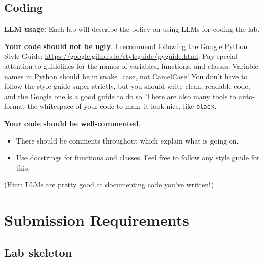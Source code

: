\documentclass[letterpaper,12pt]{article}
\begin{document}
\subsection{Coding}

\textbf{LLM usage:} Each lab will describe the policy on using LLMs for coding the lab.

\textbf{Your code should not be ugly}. I recommend following the Google Python Style Guide: \url{https://google.github.io/styleguide/pyguide.html}. Pay special attention to guidelines for the names of variables, functions, and classes. Variable names in Python should be in snake\_case, not CamelCase! You don't have to follow the style guide super strictly, but you should write clean, readable code, and the Google one is a good guide to do so. There are also many tools to auto-format the whitespace of your code to make it look nice, like \texttt{black}.

\textbf{Your code should be well-commented}.
\begin{itemize}
  \item There should be comments throughout which explain what is going on.
  \item Use docstrings for functions and classes. Feel free to follow any style guide for this.
\end{itemize}
(Hint: LLMs are pretty good at documenting code you've written!)


\section{Submission Requirements}

\subsection{Lab skeleton}
\end{document}

